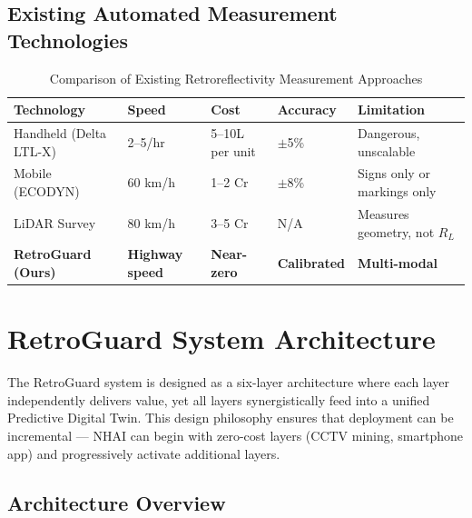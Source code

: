 \documentclass[11pt,a4paper]{article}
\begin{document}
\subsection{Existing Automated Measurement Technologies}

\begin{table}[H]
\centering
\caption{Comparison of Existing Retroreflectivity Measurement Approaches}
\label{tab:existing_tech}
\begin{tabular}{@{}p{3cm}p{2.5cm}p{2.5cm}p{2.5cm}p{2.5cm}@{}}
\toprule
\textbf{Technology} & \textbf{Speed} & \textbf{Cost} & \textbf{Accuracy} & \textbf{Limitation} \\
\midrule
Handheld (Delta LTL-X) & 2--5/hr & 5--10L per unit & $\pm$5\% & Dangerous, unscalable \\
Mobile (ECODYN) & 60 km/h & 1--2 Cr & $\pm$8\% & Signs only or markings only \\
LiDAR Survey & 80 km/h & 3--5 Cr & N/A & Measures geometry, not $R_L$ \\
\midrule
\textbf{RetroGuard (Ours)} & \textbf{Highway speed} & \textbf{Near-zero} & \textbf{Calibrated} & \textbf{Multi-modal} \\
\bottomrule
\end{tabular}
\end{table}


\section{RetroGuard System Architecture}
\label{sec:architecture}

The RetroGuard system is designed as a six-layer architecture where each layer independently delivers value, yet all layers synergistically feed into a unified Predictive Digital Twin. This design philosophy ensures that deployment can be incremental --- NHAI can begin with zero-cost layers (CCTV mining, smartphone app) and progressively activate additional layers.

\subsection{Architecture Overview}
\end{document}
